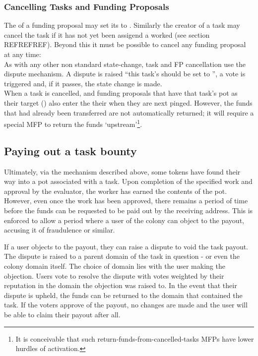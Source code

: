 \subsubsection{Cancelling Tasks and Funding Proposals}
The  of a funding proposal may set its  to . Similarly the creator of a task may cancel the task if it has not yet been assigend a worked (see section REFREFREF). Beyond this it must be possible to cancel any funding proposal at any time:\\
As with any other non standard state-change, task and FP cancellation use the dispute mechanism. A dispute is raised ``this task's  should be set to '', a vote is triggered and, if it passes, the state change is made.\\
When a task is cancelled, and funding proposals that have that task's pot as their target () also enter the  their  when they are next pinged. However, the funds that had already been transferred are not automatically returned; it will require a special MFP to return the funds `upstream'\footnote{It is conceivable that such return-funds-from-cancelled-tasks MFPs have lower hurdles of activation.}.

\subsection{Paying out a task bounty}
Ultimately, via the mechanism described above, some tokens have found their way into a pot associated with a task. Upon completion of the specified work and approval by the evaluator, the worker has earned the contents of the pot. However, even once the work has been approved, there remains a period of time before the funds can be requested to be paid out by the receiving address. This is enforced to allow a period where a user of the colony can object to the payout, accusing it of fraudulence or similar.

If a user objects to the payout, they can raise a dispute to void the task payout. The dispute is raised to a parent domain of the task in question - or even the colony domain itself. The choice of domain lies with the user making the objection. Users vote to resolve the dispute with votes weighted by their reputation in the domain the objection was raised to. In the event that their dispute is upheld, the funds can be returned to the domain that contained the task. If the voters approve of the payout, no changes are made and the user will be able to claim their payout after all.

